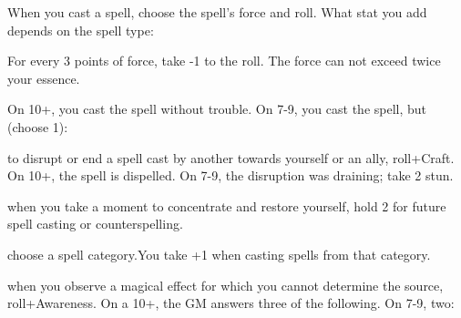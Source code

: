 \begin{dossier}
\hspace{.5cm}%
\vrule width 2pt
\hspace{.3cm}%
\begin{dossiermovebar}
\fontsize{9pt}{1em}\selectfont
\setlength{\parskip}{.01cm}

 When you cast a spell, choose the spell's force and roll. What stat you add 
depends on the spell type: 
\begin{moveoptions}




\end{moveoptions}

For every 3 points of force, take -1 to the roll. The force can not exceed twice your essence.

On 10+, you cast the spell without trouble. On 7-9, you cast the spell, but (choose 1): 
\begin{moveoptions}



\end{moveoptions}

 to disrupt or end a spell cast by another towards yourself or an ally, roll+Craft. 
On 10+, the spell is dispelled. On 7-9, the disruption was draining; take 2 stun.

 when you take a moment to concentrate and restore yourself, hold 2 for future spell casting or counterspelling.

 choose a spell category.You take +1 when casting spells from that category. 

     when you observe a magical effect for which you cannot determine the 
      source, roll+Awareness. On a 10+, the GM answers three of the following. On 7-9, two: 
\begin{moveoptions}


\end{moveoptions}
\end{dossiermovebar}
\end{dossier}
